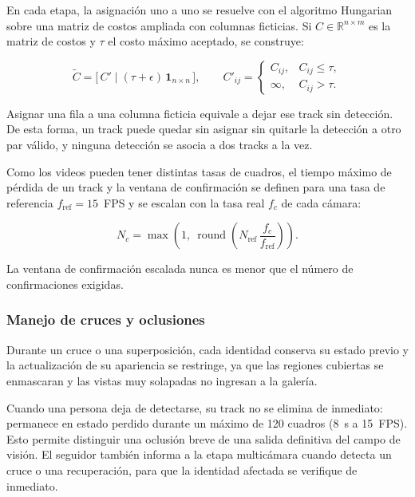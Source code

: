 \documentclass[12pt,letterpaper]{article}
\begin{document}
En cada etapa, la asignación uno a uno se resuelve con el algoritmo
Hungarian sobre una matriz de costos ampliada con columnas ficticias. Si
$C\in\mathbb{R}^{n\times m}$ es la matriz de costos y $\tau$ el costo
máximo aceptado, se construye:

\begin{equation}
\tilde{C}=
\big[\,C' \;\big|\; (\tau+\epsilon)\,\mathbf{1}_{n\times n}\,\big],
\qquad
C'_{ij}=
\begin{cases}
C_{ij}, & C_{ij}\le\tau,\\
\infty, & C_{ij}>\tau.
\end{cases}
\end{equation}

Asignar una fila a una columna ficticia equivale a dejar ese track sin
detección. De esta forma, un track puede quedar sin asignar sin quitarle
la detección a otro par válido, y ninguna detección se asocia a dos
tracks a la vez.

Como los videos pueden tener distintas tasas de cuadros, el tiempo máximo
de pérdida de un track y la ventana de confirmación se definen para una
tasa de referencia $f_{\text{ref}}=15$~FPS y se escalan con la tasa real
$f_c$ de cada cámara:

\begin{equation}
N_c = \max\!\left(1,\ \operatorname{round}\!\left(N_{\text{ref}}\,\frac{f_c}{f_{\text{ref}}}\right)\right).
\end{equation}

La ventana de confirmación escalada nunca es menor que el número de
confirmaciones exigidas.

\subsubsection{Manejo de cruces y oclusiones}

Durante un cruce o una superposición, cada identidad conserva su estado
previo y la actualización de su apariencia se restringe, ya que las
regiones cubiertas se enmascaran y las vistas muy solapadas no ingresan
a la galería.

Cuando una persona deja de detectarse, su track no se elimina de
inmediato: permanece en estado perdido durante un máximo de 120 cuadros
(8~s a 15~FPS). Esto permite distinguir una oclusión breve de una salida
definitiva del campo de visión. El seguidor también informa a la etapa
multicámara cuando detecta un cruce o una recuperación, para que la
identidad afectada se verifique de inmediato.
\end{document}
